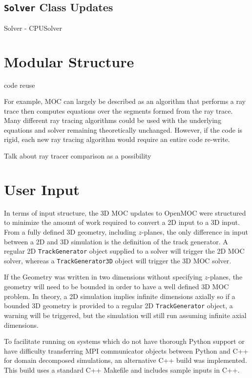 \subsection{\texttt{Solver} Class Updates}
\label{sec:oo-solver}

Solver - CPUSolver

\section{Modular Structure}
\label{sec:modular-structure}

code reuse

For example, MOC can largely be described as an algorithm that performs a ray trace then computes equations over the segments formed from the ray trace. Many different ray tracing algorithms could be used with the underlying equations and solver remaining theoretically unchanged. However, if the code is rigid, each new ray tracing algorithm would require an entire code re-write. 

Talk about ray tracer comparison as a possibility

\section{User Input}
\label{sec:user-input}

In terms of input structure, the 3D MOC updates to OpenMOC were structured to minimize the amount of work required to convert a 2D input to a 3D input. From a fully defined 3D geometry, including $z$-planes, the only difference in input between a 2D and 3D simulation is the definition of the track generator. A regular 2D \texttt{TrackGenerator} object supplied to a solver will trigger the 2D MOC solver, whereas a \texttt{TrackGenerator3D} object will trigger the 3D MOC solver.

If the Geometry was written in two dimensions without specifying $z$-planes, the geometry will need to be bounded in order to have a well defined 3D MOC problem. In theory, a 2D simulation implies infinite dimensions axially so if a bounded 3D geometry is provided to a regular 2D \texttt{TrackGenerator} object, a warning will be triggered, but the simulation will still run assuming infinite axial dimensions.

To facilitate running on systems which do not have thorough Python support or have difficulty transferring MPI communicator objects between Python and C++ for domain decomposed simulations, an alternative C++ build was implemented. This build uses a standard C++ Makefile and includes sample inputs in C++.

